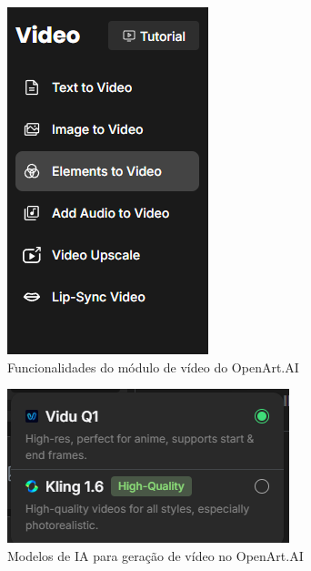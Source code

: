 \begin{figure}[htbp]
\begin{minipage}{0.45\textwidth}
    \end{minipage}
    \hfill
    \begin{minipage}{0.45\textwidth}
    \centering
    \caption{\small Funcionalidades do módulo de vídeo do OpenArt.AI}
    \label{fig:openArtModuloVideo}
    \includegraphics[width=0.7\linewidth]{figs/OpenArtAI/telaVideoModulos.PNG}
    \end{minipage}
\end{figure}

\begin{figure}[htbp]
    \centering
    \caption{\small Modelos de IA para geração de vídeo no OpenArt.AI}
    \label{fig:openArtModelosVideo}
    \includegraphics[width=0.5\linewidth]{figs/OpenArtAI/opcoesModeloVideo.PNG}
\end{figure}


